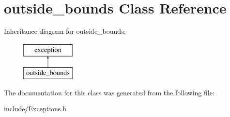 \hypertarget{classoutside__bounds}{}\section{outside\+\_\+bounds Class Reference}
\label{classoutside__bounds}
Inheritance diagram for outside\+\_\+bounds\+:\begin{figure}[H]
\begin{center}
\leavevmode
\includegraphics[height=2.000000cm]{classoutside__bounds}
\end{center}
\end{figure}


The documentation for this class was generated from the following file\+:\begin{DoxyCompactItemize}
\item 
include/Exceptions.\+h\end{DoxyCompactItemize}
